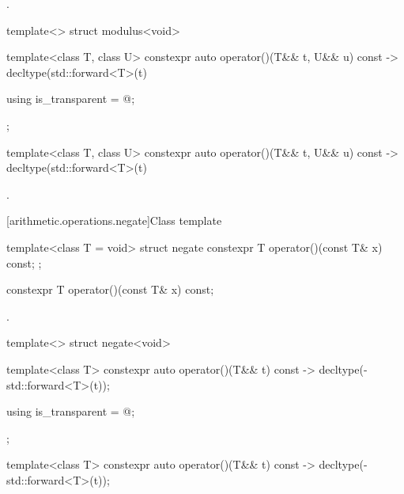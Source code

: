 \begin{itemdescr}
\pnum
\returns
{}.
\end{itemdescr}

%
\begin{itemdecl}
template<> struct modulus<void> {
  template<class T, class U> constexpr auto operator()(T&& t, U&& u) const
    -> decltype(std::forward<T>(t) %

  using is_transparent = @\unspec@;
};
\end{itemdecl}

%
\begin{itemdecl}
template<class T, class U> constexpr auto operator()(T&& t, U&& u) const
    -> decltype(std::forward<T>(t) %
\end{itemdecl}

\begin{itemdescr}
\pnum
\returns
{}.
\end{itemdescr}

[arithmetic.operations.negate]{Class template }

%
\begin{itemdecl}
template<class T = void> struct negate {
  constexpr T operator()(const T& x) const;
};
\end{itemdecl}

%
\begin{itemdecl}
constexpr T operator()(const T& x) const;
\end{itemdecl}

\begin{itemdescr}
\pnum
\returns
{}.
\end{itemdescr}

%
\begin{itemdecl}
template<> struct negate<void> {
  template<class T> constexpr auto operator()(T&& t) const
    -> decltype(-std::forward<T>(t));

  using is_transparent = @\unspec@;
};
\end{itemdecl}

%
\begin{itemdecl}
template<class T> constexpr auto operator()(T&& t) const
    -> decltype(-std::forward<T>(t));
\end{itemdecl}

